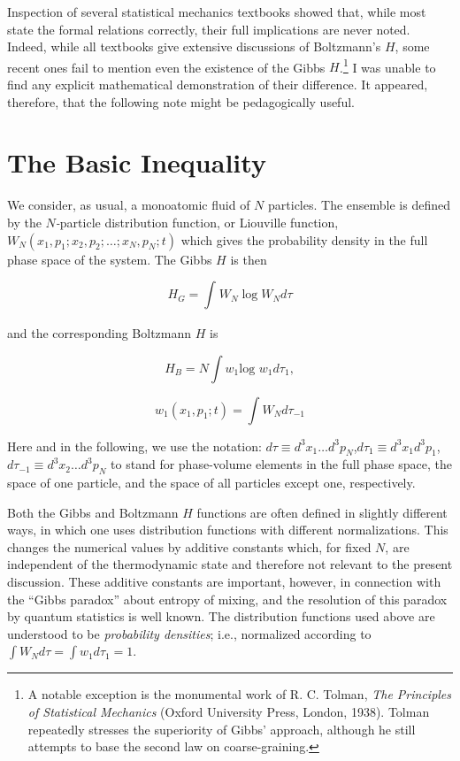 \documentclass[twocolumn]{article}
\begin{document}
Inspection of several statistical mechanics textbooks showed that, while
most state the formal relations correctly, their full implications are
never noted. Indeed, while all textbooks give extensive discussions of
Boltzmann's \(H\), some recent ones fail to mention even the existence
of the Gibbs \(H\)\emph{.}\footnote{A notable exception is the
  monumental work of R. C. Tolman, \emph{The Principles of Statistical
  Mechanics} (Oxford University Press, London, 1938). Tolman repeatedly
  stresses the superiority of Gibbs' approach, although he still
  attempts to base the second law on coarse-graining.} I was unable to
find any explicit mathematical demonstration of their difference. It
appeared, therefore, that the following note might be pedagogically
useful.

\section{The Basic Inequality}\label{sec-the-basic-inequality}

We consider, as usual, a monoatomic fluid of \(N\) particles. The
ensemble is defined by the \(N\)\emph{-}particle distribution function,
or Liouville function,
\(W_{N}(x_{1},p_{1};x_{2},p_{2};\ldots;x_{N},p_{N};t)\) which gives the
probability density in the full phase space of the system. The Gibbs
$H$ is then

\begin{equation}
H_{G} = {\int_{}^{}{W_{N}\log W_{N}}} d\tau
\label{eqn-one}
\end{equation}

and the corresponding Boltzmann $H$ is

\begin{equation}
H_{B} = N\int w_{1}\text{log\ }w_{1}d\tau_{1},
\label{eqn-two}
\end{equation}

\begin{equation}
w_{1}\left( x_{1},p_{1};t \right) = \int W_{N}d\tau_{- 1}
\label{eqn-three}
\end{equation}

Here and in the following, we use the notation:
\(d\tau \equiv d^{3}x_{1}\ldots d^{3}p_{N}\),\(d\tau_{1} \equiv d^{3}x_{1}d^{3}p_{1}\),\(d\tau_{- 1} \equiv d^{3}x_{2}\ldots d^{3}p_{N}\)
to stand for phase-volume elements in the full phase space, the space of
one particle, and the space of all particles except one, respectively.

Both the Gibbs and Boltzmann $H$ functions are often defined in
slightly different ways, in which one uses distribution functions with
different normalizations. This changes the numerical values by additive
constants which, for fixed $N$, are independent of the
thermodynamic state and therefore not relevant to the present
discussion. These additive constants are important, however, in
connection with the ``Gibbs paradox'' about entropy of mixing, and the
resolution of this paradox by quantum statistics is well known. The
distribution functions used above are understood to be \emph{probability
densities}; i.e., normalized according to
\(\int W_{N}d\tau = \int w_{1}d\tau_{1} = 1\).
\end{document}
